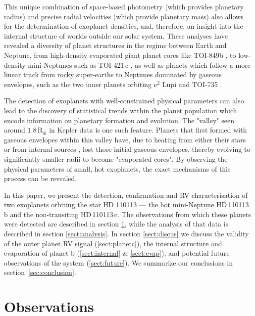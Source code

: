 \documentclass[fleqn,usenatbib]{mnras}
\newcommand{\gcm}{g\,cm$^{-3}$}	%
\newcommand{\rearth}{R$_{\oplus}$}
\newcommand{\Tplanet}{HD\,110113\,b}
\newcommand{\Tplanetc}{HD\,110113\,c}
\begin{document}
This unique combination of space-based photometry (which provides planetary radius) and precise radial velocities (which provide planetary mass) also allows for the determination of exoplanet densities, and, therefore, an insight into the internal structure of worlds outside our solar system.
These analyses have revealed a diversity of planet structures in the regime between Earth and Neptune, from high-density evaporated giant planet cores like TOI-849b \citep[5.2\,\gcm{}][]{armstrong2020remnant}, to low-density mini-Neptunes such as TOI-421\,c \citep{carleo2020multi}, as well as planets which follow a more linear track from rocky super-earths to Neptunes dominated by gaseous envelopes, such as the two inner planets orbiting $\nu^2$ Lupi \citep{kane2020transits} and TOI-735 \citep{cloutier2020pair,nowak2020carmenes}.

The detection of exoplanets with well-constrained physical parameters can also lead to the discovery of statistical trends within the planet population which encode information on planetary formation and evolution.
The "valley" seen around $1.8$\,\rearth{} in Kepler data \citep{fulton2017california, van2018asteroseismic} is one such feature.
Planets that first formed with gaseous envelopes within this valley have, due to heating from either their stars \citep[e.g. evaporation,][]{owen2017evaporation} or from internal sources \citep[e.g. core-powered mass loss,][]{ginzburg2018core}, lost those initial gaseous envelopes, thereby evolving to significantly smaller radii to become "evaporated cores".
By observing the physical parameters of small, hot exoplanets, the exact mechanisms of this process can be revealed.

In this paper, we present the detection, confirmation and RV characterisation of two exoplanets orbiting the star HD 110113 --- the hot mini-Neptune \Tplanet{} and the non-transiting \Tplanetc{}. 
The observations from which these planets were detected are described in section \ref{sect:observations}, while the analysis of that data is described in section \ref{sect:analysis}.
In section \ref{sect:discus} we discuss the validity of the outer planet RV signal (\ref{sect:planetc}), the internal structure and evaporation of planet b (\ref{sect:internal} \& \ref{sect:evap}), and potential future observations of the system (\ref{sect:future}).
We summarize our conclusions in section~\ref{sec:conclusion}.

\section{Observations}
\label{sect:observations}
\end{document}
